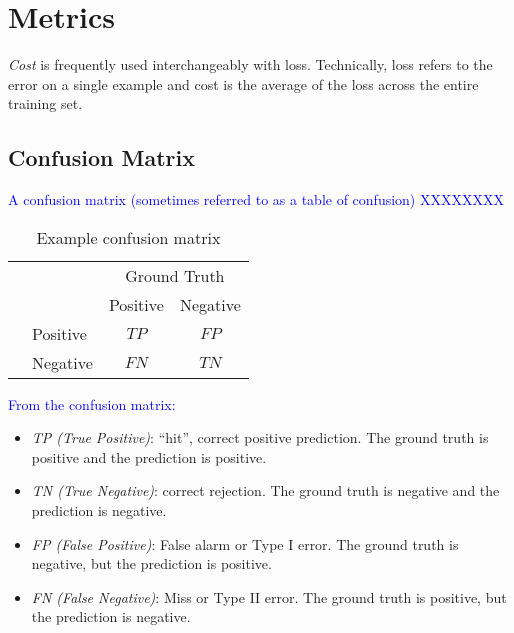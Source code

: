 \section{Metrics}

\emph{Cost} is frequently used interchangeably with loss. Technically, loss refers to the error on a single example and cost is the average of the loss across the entire training set.

\subsection{Confusion Matrix}
\textcolor{blue}{A confusion matrix (sometimes referred to as a table of confusion) XXXXXXXX}

\begin{table}
	\centering
	\begin{tabular}{l|l|c|c|}
		\multicolumn{2}{c}{}&\multicolumn{2}{c}{Ground Truth}\\ 
		\cline{3-4}
		\multicolumn{2}{c|}{}&Positive&Negative\\ 
		\cline{2-4}
		\multirow{2}{*}{\rotatebox{90}{Pred}}& Positive & $TP$ & $FP$ \\ 
		\cline{2-4}
		& Negative & $FN$ & $TN$ \\ 
		\cline{2-4}
	\end{tabular}
	\caption{Example confusion matrix}
	\label{tab:sample_conf_matrix}
\end{table}

\textcolor{blue}{From the confusion matrix:}

\begin{itemize}
	
\item \textit{TP (True Positive)}: ``hit'', correct positive prediction. The ground truth is positive and the prediction is positive.

\item \textit{TN (True Negative)}: correct rejection. The ground truth is negative and the prediction is negative.

\item \textit{FP (False Positive)}: False alarm or Type I error. The ground truth is negative, but the prediction is positive.

\item \textit{FN (False Negative)}: Miss or Type II error. The ground truth is positive, but the prediction is negative.
	
\end{itemize}

